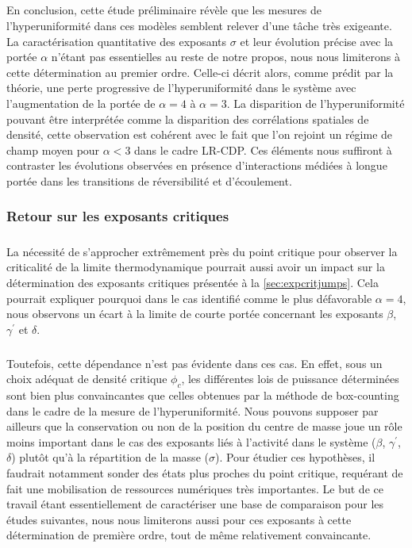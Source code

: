\subparagraph{}En conclusion, cette étude préliminaire révèle que les mesures de l'hyperuniformité dans ces modèles semblent relever d'une tâche très exigeante. La caractérisation quantitative des exposants $\sigma$ et leur évolution précise avec la portée $\alpha$ n'étant pas essentielles au reste de notre propos, nous nous limiterons à cette détermination au premier ordre. Celle-ci décrit alors, comme prédit par la théorie, une perte progressive de l'hyperuniformité dans le système avec l'augmentation de la portée de $\alpha=4$ à $\alpha=3$. La disparition de l'hyperuniformité pouvant être interprétée comme la disparition des corrélations spatiales de densité, cette observation est cohérent avec le fait que l'on rejoint un régime de champ moyen pour $\alpha <3$ dans le cadre LR-CDP. Ces éléments nous suffiront à contraster les évolutions observées en présence d'interactions médiées à longue portée dans les transitions de réversibilité et d'écoulement.

\subsubsection{Retour sur les exposants critiques}

\subparagraph{}La nécessité de s'approcher extrêmement près du point critique pour observer la criticalité de la limite thermodynamique pourrait aussi avoir un impact sur la détermination des exposants critiques présentée à la \autoref{sec:expcritjumps}. Cela pourrait expliquer pourquoi dans le cas identifié comme le plus défavorable $\alpha=4$, nous observons un écart à la limite de courte portée concernant les exposants $\beta$, $\gamma^\prime$ et $\delta$.

\subparagraph{}Toutefois, cette dépendance n'est pas évidente dans ces cas. En effet, sous un choix adéquat de densité critique $\phi_c$, les différentes lois de puissance déterminées sont bien plus convaincantes que celles obtenues par la méthode de box-counting dans le cadre de la mesure de l'hyperuniformité. Nous pouvons supposer par ailleurs que la conservation ou non de la position du centre de masse joue un rôle moins important dans le cas des exposants liés à l'activité dans le système ($\beta$, $\gamma^\prime$, $\delta$) plutôt qu'à la répartition de la masse ($\sigma$). Pour étudier ces hypothèses, il faudrait notamment sonder des états plus proches du point critique, requérant de fait une mobilisation de ressources numériques très importantes. Le but de ce travail étant essentiellement de caractériser une base de comparaison pour les études suivantes, nous nous limiterons aussi pour ces exposants à cette détermination de première ordre, tout de même relativement convaincante.

